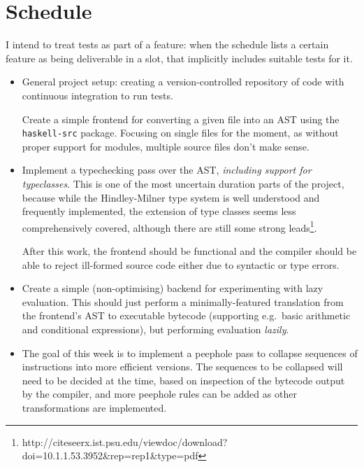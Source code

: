 \documentclass[12pt]{article}
\newcommand\monospace[1]{\texttt{#1}}
\begin{document}
\section*{Schedule}

I intend to treat tests as part of a feature: when the schedule lists a certain feature as being deliverable in a slot,
that implicitly includes suitable tests for it.




\begin{itemize}
\item
{

    General project setup: creating a version-controlled repository of code with continuous integration to run tests.

    Create a simple frontend for converting a given file into an AST using the \monospace{haskell-src} package. Focusing
    on single files for the moment, as without proper support for modules, multiple source files don't make sense.
}
\item
{

    Implement a typechecking pass over the AST, \textit{including support for typeclasses}. This is one of the most
    uncertain duration parts of the project, because while the Hindley-Milner type system is well understood and
    frequently implemented, the extension of type classes seems less comprehensively covered, although there are still
    some strong leads\footnote{http://citeseerx.ist.psu.edu/viewdoc/download?doi=10.1.1.53.3952\&rep=rep1\&type=pdf}.

    After this work, the frontend should be functional and the compiler should be able to reject ill-formed
    source code either due to syntactic or type errors.
}
\item
{

    Create a simple (non-optimising) backend for experimenting with lazy evaluation. This should just perform a
    minimally-featured translation from the frontend's AST to executable bytecode (supporting e.g.\ basic arithmetic and
    conditional expressions), but performing evaluation \textit{lazily}.
}
\item
{

    The goal of this week is to implement a peephole pass to collapse sequences of instructions into more efficient
    versions. The sequences to be collapsed will need to be decided at the time, based on inspection of the bytecode
    output by the compiler, and more peephole rules can be added as other transformations are implemented.
    
}
\end{itemize}
\end{document}
